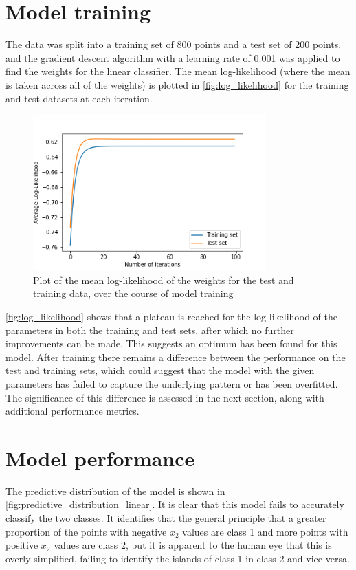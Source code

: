 \documentclass[a4paper]{article}
\begin{document}
    \section{Model training}\label{sec:model-training}
    The data was split into a training set of 800 points and a test set of 200 points, and the gradient descent
    algorithm with a learning rate of 0.001 was applied to find the weights for the linear classifier. The mean
    log-likelihood (where the mean is taken across all of the weights) is plotted in \autoref{fig:log_likelihood} for
    the training and test datasets at each iteration.

    \begin{figure}[h]
        \label{fig:log_likelihood}
        \centering
        \includegraphics[width=0.8\textwidth]{plots/log_likelihood.png}
        \caption{Plot of the mean log-likelihood of the weights for the test and training data, over the
        course of model training}
    \end{figure}

    \autoref{fig:log_likelihood} shows that a plateau is reached for the log-likelihood of the parameters in both the
    training and test sets, after which no further improvements can be made. This suggests an optimum has been found for
    this model. After training there remains a difference between the performance on the test and training sets, which
    could suggest that the model with the given parameters has failed to capture the underlying pattern or has been
    overfitted. The significance of this difference is assessed in the next section, along with additional performance
    metrics.

    \section{Model performance}\label{sec:model-performance}
    The predictive distribution of the model is shown in \autoref{fig:predictive_distribution_linear}. It is clear that
    this model fails to accurately classify the two classes. It identifies that the general principle that a greater
    proportion of the points with negative $x_2$ values are class 1 and more points with positive $x_2$ values are class
    2, but it is apparent to the human eye that this is overly simplified, failing to identify the islands of class 1 in
    class 2 and vice versa.
\end{document}
